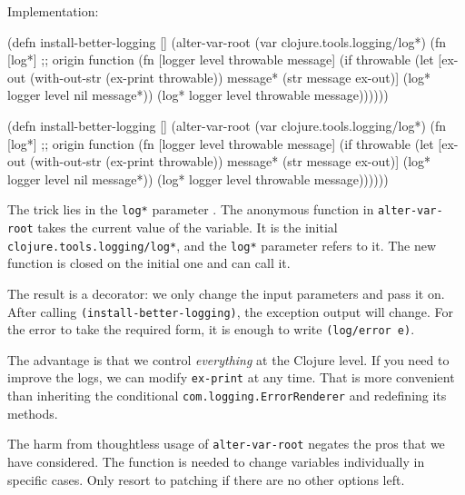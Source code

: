 \noindent
Implementation:


\ifx\DEVICETYPE\MOBILE

\begin{clojure/lines}
(defn install-better-logging []
  (alter-var-root
   (var clojure.tools.logging/log*)
   (fn [log*] ;; origin function
     (fn [logger level
          throwable message]
       (if throwable
         (let [ex-out (with-out-str
                        (ex-print
                          throwable))
               message* (str message
                          \newline
                          ex-out)]
           (log* logger
             level nil message*))
           (log* logger level
             throwable message))))))
\end{clojure/lines}

\else

\begin{clojure/lines}
(defn install-better-logging []
  (alter-var-root
   (var clojure.tools.logging/log*)
   (fn [log*] ;; origin function
     (fn [logger level throwable message]
       (if throwable
         (let [ex-out (with-out-str (ex-print throwable))
               message* (str message \newline ex-out)]
           (log* logger level nil message*))
         (log* logger level throwable message))))))
\end{clojure/lines}

\fi

\noindent
The trick lies in the \verb|log*| parameter . The anonymous function in \verb|alter-var-root| takes the current value of the variable. It is the initial \verb|clojure.tools.logging/log*|, and the \verb|log*| parameter refers to it.
The new function is closed on the initial one and can call it.

The result is a decorator: we only change the input parameters and pass it on. After calling \verb|(install-better-logging)|, the exception output will change.
For the error to take the required form, it is enough to write \verb|(log/error e)|.

The advantage is that we control \emph{everything} at the Clojure level.
If you need to improve the logs, we can modify \verb|ex-print| at any time.
That is more convenient than inheriting the conditional \verb|com.logging.ErrorRenderer| and redefining its methods.

The harm from thoughtless usage of \verb|alter-var-root| negates the pros that we have considered.
The function is needed to change variables individually in specific cases.
Only resort to patching if there are no other options left.

